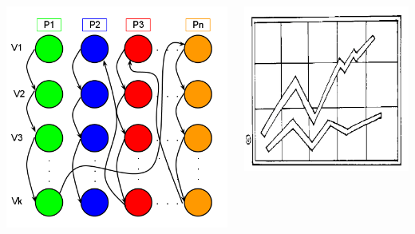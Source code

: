 \documentclass[final]{beamer}
\begin{document}
\begin{frame}[t]
\begin{columns}[t]
\begin{column}{0.60\paperwidth}
\begin{columns}[t,totalwidth=0.60\paperwidth]
\begin{column}{0.28\paperwidth}
\begin{columns}[t,totalwidth=0.28\paperwidth]
\begin{column}{0.12\paperwidth}
								\begin{center} \includegraphics[width=0.12\paperwidth]{img/linked_list/seq_node_rand_proc} \end{center}
							\end{column}
							\begin{column}{0.12\paperwidth}
								\begin{center} \includegraphics[width=0.12\paperwidth]{img/temp} \end{center}
							\end{column}
						\end{columns}
					\end{column}

\end{columns}
\end{column}
\end{columns}
\end{frame}
\end{document}
